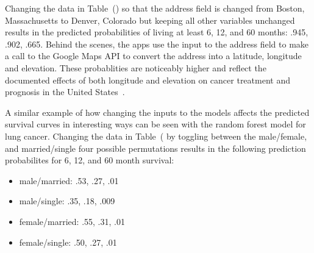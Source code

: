 \documentclass[10pt,letterpaper]{article}
\begin{document}
Changing the data in Table~() so that the address field is changed from Boston, Massachusetts to Denver, Colorado but keeping all other variables unchanged results in the predicted probabilities of living at least 6, 12, and 60 months: .945, .902, .665. 
Behind the scenes, the apps use the input to the address field to make a call to the Google Maps API to convert the address into a latitude, longitude and elevation.
These probablities are noticeably higher and reflect the documented effects of both longitude and elevation on cancer treatment and prognosis in the United States~\cite{kob4}.

A similar example of how changing the inputs to the models affects the predicted survival curves in interesting ways can be seen with the random forest model for lung cancer. Changing the data in Table~( by toggling between the male/female, and married/single four possible permutations results in the following prediction probabilites for 6, 12, and 60 month survival:

\begin{itemize}[noitemsep]
\item male/married:  .53, .27, .01
\item male/single: .35, .18, .009
\item female/married:  .55, .31, .01
\item female/single: .50, .27, .01
\end{itemize}
\end{document}
